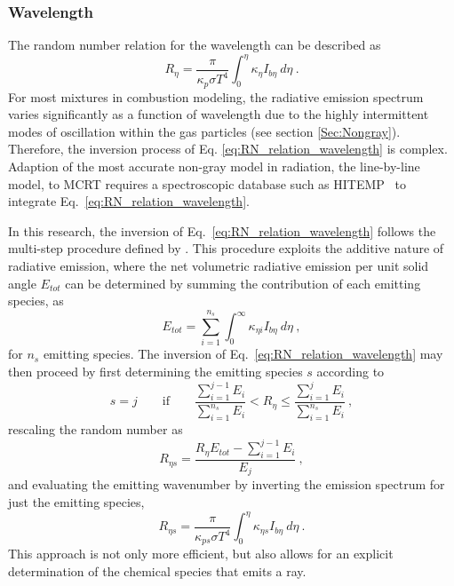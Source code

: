 \subsubsection{Wavelength}
The random number relation for the wavelength can be described as
\begin{equation}
    R_\eta{}=\frac{\pi{}}{\kappa{}_p\sigma{}T^4}\int_0^\eta{}\kappa{}_\eta{}I_{b\eta{}}~d\eta{}~.
    \label{eq:RN_relation_wavelength}
\end{equation}
For most mixtures in combustion modeling, the radiative emission spectrum varies significantly as a function of wavelength due to the highly intermittent modes of oscillation within the gas particles (see section \ref{Sec:Nongray}). 
Therefore, the inversion process of Eq. \ref{eq:RN_relation_wavelength} is complex.
Adaption of the most accurate non-gray model in radiation, the line-by-line model, to MCRT requires a spectroscopic database such as HITEMP~\cite{Rothman2010HITEMPDatabase} to integrate Eq.~\ref{eq:RN_relation_wavelength}. 

In this research, the inversion of Eq.~\ref{eq:RN_relation_wavelength} follows the multi-step procedure defined by \citet{Ren2013AGases}. This procedure exploits the additive nature of radiative emission, where the net volumetric radiative emission per unit solid angle $E_{tot}$ can be determined by summing the contribution of each emitting species, as
\begin{equation}
    E_{tot} = \sum_{i=1}^{n_s}\int_0^\infty{}{\kappa{}_{\eta{}i}I_{b\eta}~d\eta}~,
    \label{eq:Net_emission_by species}
\end{equation}
for $n_s$ emitting species. The inversion of Eq.~\ref{eq:RN_relation_wavelength} may then proceed by first determining the emitting species $s$ according to
\begin{equation}
    s=j \qquad \text{if} \qquad \frac{\sum\limits_{i=1}^{j-1}E_i}{\sum\limits_{i=1}^{n_s}E_i} < R_\eta \leq \frac{\sum\limits_{i=1}^{j}E_i}{\sum\limits_{i=1}^{n_s}E_i}~,
\end{equation}
rescaling the random number as
\begin{equation}
    R_{\eta{}s}=\frac{R_\eta{}E_{tot}-\sum\limits_{i=1}^{j-1}{E_i}}{E_j}~,
\end{equation}
and evaluating the emitting wavenumber by inverting the emission spectrum for just the emitting species,
\begin{equation}
    R_{\eta{}s}=\frac{\pi}{\kappa_{ps}\sigma{}T^4}\int_0^\eta{}{\kappa_{\eta{}s}I_{b\eta}~d\eta}~.
    \label{eq:RN_wavelength_by_species}
\end{equation}
This approach is not only more efficient, but also allows for an explicit determination of the chemical species that emits a ray.

